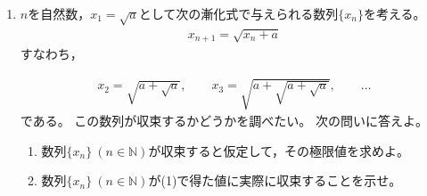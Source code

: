 \documentclass[autodetect-engine,ja=standard, 10.5pt, a4paper, titlepage]{bxjsarticle}
\begin{document}
\begin{enumerate}[1.]
\baselineskip

    \item
    $n$を自然数，$x_1 = \sqrt{a}$として次の漸化式で与えられる数列$\{x_n\}$を考える。
    \begin{align*}
      x_{n+1} = \sqrt{x_n + a}
    \end{align*}
    すなわち，

      \begin{align*}
        x_2 = \sqrt{a + \sqrt{a}}, \qquad x_3 = \sqrt{a + \sqrt{a + \sqrt{a}}}, \qquad\dots
      \end{align*}
    である。
    この数列が収束するかどうかを調べたい。
    次の問いに答えよ。

    \begin{enumerate}[(1)]
      \item 数列$\{x_n\}\:(n\in \mathbb{N})$が収束すると仮定して，その極限値を求めよ。
      \item 数列$\{x_n\}\:(n\in \mathbb{N})$が(1)で得た値に実際に収束することを示せ。
    \end{enumerate}



\end{enumerate}
\end{document}
